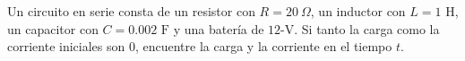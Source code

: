 \item Un circuito en serie consta de un resistor con $R = 20 \ \Omega$, un inductor con $L = 1 \text{ H}$, un capacitor con $C = 0.002 \text{ F}$ y una batería de $12\text{-V}$. Si tanto la carga como la corriente iniciales son $0$, encuentre la carga y la corriente en el tiempo $t$.
